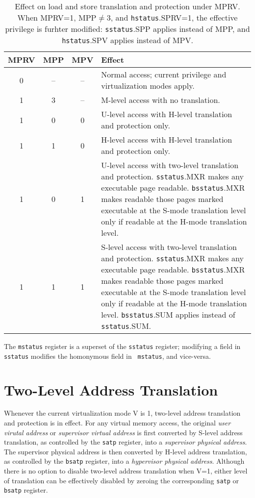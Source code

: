\begin{table*}[h!]
\begin{center}
\begin{tabular}{|c|c|c||p{5in}|}
  \hline
   MPRV & MPP & MPV & Effect \\ \hline \hline
   0    & --  & -- & Normal access; current privilege and virtualization modes apply. \\ \hline
   1    & 3   & -- & M-level access with no translation. \\ \hline
   1    & 0   & 0  & U-level access with H-level translation and protection only. \\ \hline
   1    & 1   & 0  & H-level access with H-level translation and protection only.  \\ \hline
   1    & 0   & 1  & U-level access with two-level translation and protection. {\tt sstatus}.MXR makes any executable page readable.  {\tt bsstatus}.MXR makes readable those pages marked executable at the S-mode translation level only if readable at the H-mode translation level. \\ \hline
   1    & 1   & 1  & S-level access with two-level translation and protection. {\tt sstatus}.MXR makes any executable page readable.  {\tt bsstatus}.MXR makes readable those pages marked executable at the S-mode translation level only if readable at the H-mode translation level. {\tt bsstatus}.SUM applies instead of {\tt sstatus}.SUM. \\ \hline
 \end{tabular}
\end{center}
\caption{Effect on load and store translation and protection under MPRV.  When MPRV=1, MPP$\neq$3, and {\tt hstatus}.SPRV=1, the effective privilege is furhter modified: {\tt sstatus}.SPP applies instead of MPP, and {\tt hstatus}.SPV applies instead of MPV.}
\label{h-mprv}
\end{table*}

The {\tt mstatus} register is a superset of the {\tt sstatus} register;
modifying a field in {\tt sstatus} modifies the homonymous field in {\tt
mstatus}, and vice-versa.

\section{Two-Level Address Translation}

Whenever the current virtualization mode V is 1, two-level address translation
and protection is in effect.  For any virtual memory access, the original {\em
user virutal address} or {\em supervisor virtual address} is first converted
by S-level address translation, as controlled by the {\tt satp} register, into
a {\em supervisor physical address}.  The supervisor physical address is then
converted by H-level address translation, as controlled by the {\tt bsatp}
register, into a {\em hypervisor physical address}.
Although there is no option to disable two-level address translation when V=1,
either level of translation can be effectively disabled by zeroing the
corresponding {\tt satp} or {\tt bsatp} register.

